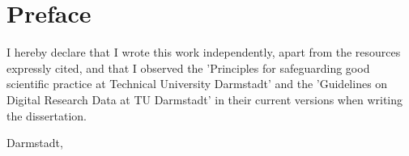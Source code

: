 %
%
%
\chapter*{Preface}

\blindtext[2]

\bigskip

I hereby declare that I wrote this work independently, apart from the resources expressly cited, and that I observed the 'Principles for safeguarding good scientific practice at Technical University Darmstadt' and the 'Guidelines on Digital Research Data at TU Darmstadt' in their current versions when writing the dissertation. 

\makeatletter
\begin{flushleft}
  \@author\par
  Darmstadt,  
\end{flushleft}
\makeatother

